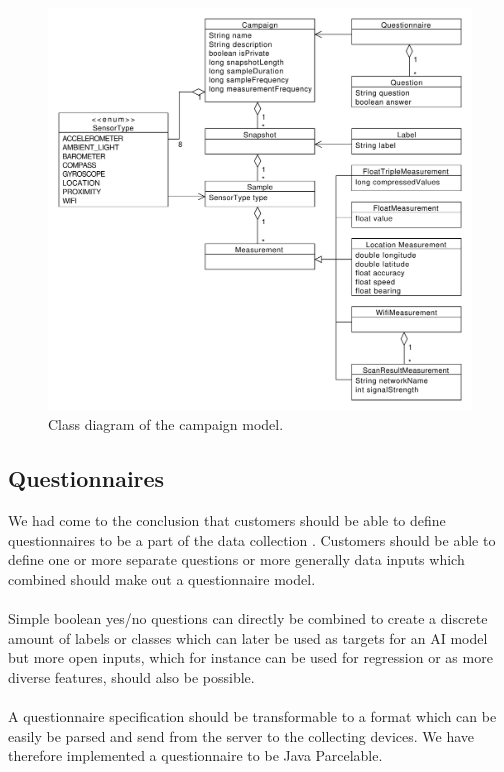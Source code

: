 \begin{figure}[!htbp]
    \centering
    \includegraphics[width=\textwidth]{graphic/gathering_sensor_data/model_class_diagram.pdf}
    \caption{Class diagram of the campaign model.}
    \label{fig:model_class_diagram}
\end{figure}
\FloatBarrier


\subsection{Questionnaires}
We had come to the conclusion that customers should be able to define questionnaires to be a part of the data collection . Customers should be able to define one or more separate questions or more generally data inputs which combined should make out a questionnaire model. 
\\\\
Simple boolean yes/no questions can directly be combined to create a discrete amount of labels or classes which can later be used as targets for an AI model but more open inputs, which for instance can be used for regression or as more diverse features, should also be possible. 
\\\\
A questionnaire specification should be transformable to a format which can be easily be parsed and send from the server to the collecting devices. We have therefore implemented a questionnaire to be Java Parcelable. 

